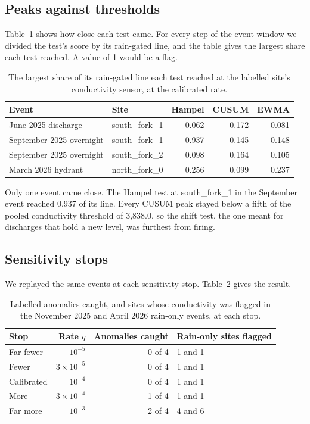 \documentclass{article}
\begin{document}
\subsection{Peaks against thresholds}
\label{sec:peaks}

Table~\ref{tab:peaks} shows how close each test came. For every step of the
event window we divided the test's score by its rain-gated line, and the table
gives the largest share each test reached. A value of 1 would be a flag.

\begin{table}[t]
  \centering
  \caption{The largest share of its rain-gated line each test reached at the
    labelled site's conductivity sensor, at the calibrated rate.}
  \label{tab:peaks}
  \begin{tabular}{llrrr}
    \toprule
    Event & Site & Hampel & CUSUM & EWMA \\
    \midrule
    June 2025 discharge      & south\_fork\_1 & 0.062 & 0.172 & 0.081 \\
    September 2025 overnight & south\_fork\_1 & 0.937 & 0.145 & 0.148 \\
    September 2025 overnight & south\_fork\_2 & 0.098 & 0.164 & 0.105 \\
    March 2026 hydrant       & north\_fork\_0 & 0.256 & 0.099 & 0.237 \\
    \bottomrule
  \end{tabular}
\end{table}

Only one event came close. The Hampel test at south\_fork\_1 in the September
event reached 0.937 of its line. Every CUSUM peak stayed below a fifth of the
pooled conductivity threshold of 3{,}838.0, so the shift test, the one meant
for discharges that hold a new level, was furthest from firing.

\subsection{Sensitivity stops}
\label{sec:stopsresult}

We replayed the same events at each sensitivity stop. Table~\ref{tab:stopsresult}
gives the result.

\begin{table}[t]
  \centering
  \caption{Labelled anomalies caught, and sites whose conductivity was flagged
    in the November 2025 and April 2026 rain-only events, at each stop.}
  \label{tab:stopsresult}
  \begin{tabular}{lrrl}
    \toprule
    Stop & Rate $q$ & Anomalies caught & Rain-only sites flagged \\
    \midrule
    Far fewer  & $10^{-5}$          & 0 of 4 & 1 and 1 \\
    Fewer      & $3 \times 10^{-5}$ & 0 of 4 & 1 and 1 \\
    Calibrated & $10^{-4}$          & 0 of 4 & 1 and 1 \\
    More       & $3 \times 10^{-4}$ & 1 of 4 & 1 and 1 \\
    Far more   & $10^{-3}$          & 2 of 4 & 4 and 6 \\
    \bottomrule
  \end{tabular}
\end{table}
\end{document}
